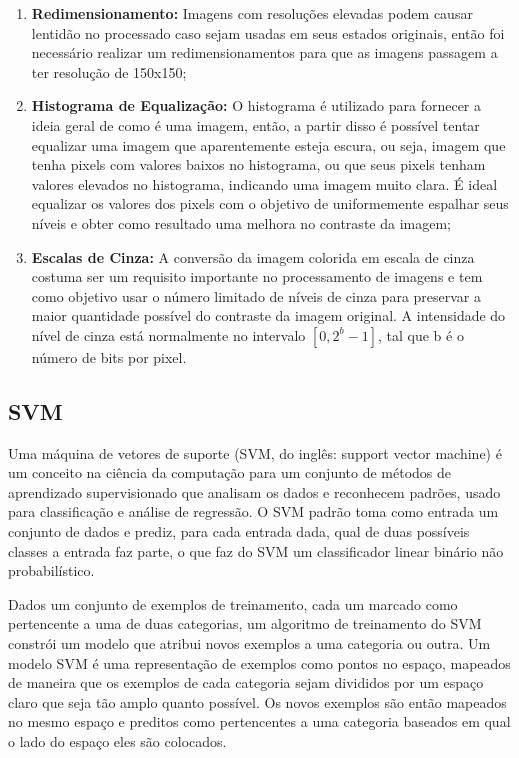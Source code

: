 \documentclass{article}
\begin{document}
\begin{enumerate}
    \item \label{sub:redm} \textbf{Redimensionamento:} Imagens com resoluções elevadas podem causar lentidão no processado caso sejam usadas em seus estados originais, então foi necessário realizar um redimensionamentos para que as imagens passagem a ter resolução de 150x150;
    \item \label{sub:histE} \textbf{Histograma de Equalização:} O histograma é utilizado para fornecer a ideia geral de como é uma imagem, então, a partir disso é possível tentar equalizar uma imagem que aparentemente esteja escura, ou seja, imagem que tenha pixels com valores baixos no histograma, ou que seus pixels tenham valores elevados no histograma, indicando uma imagem muito clara. É ideal equalizar os valores dos pixels com o objetivo de uniformemente espalhar seus níveis e obter como resultado uma melhora no contraste da imagem;
    \item \label{sub:gray} \textbf{Escalas de Cinza:} A conversão da imagem colorida em escala de cinza costuma ser um requisito importante no processamento de imagens e tem como objetivo usar o número limitado de níveis de cinza para preservar a maior quantidade possível do contraste da imagem original. A intensidade do nível de cinza está normalmente no intervalo \([0, 2^b - 1]\), tal que b é o número de bits por pixel.
\end{enumerate}

\subsection{SVM}
Uma máquina de vetores de suporte (SVM, do inglês: support vector machine) é um conceito na ciência da computação para um conjunto de métodos de aprendizado supervisionado que analisam os dados e reconhecem padrões, usado para classificação e análise de regressão. O SVM padrão toma como entrada um conjunto de dados e prediz, para cada entrada dada, qual de duas possíveis classes a entrada faz parte, o que faz do SVM um classificador linear binário não probabilístico. 

Dados um conjunto de exemplos de treinamento, cada um marcado como pertencente a uma de duas categorias, um algoritmo de treinamento do SVM constrói um modelo que atribui novos exemplos a uma categoria ou outra. Um modelo SVM é uma representação de exemplos como pontos no espaço, mapeados de maneira que os exemplos de cada categoria sejam divididos por um espaço claro que seja tão amplo quanto possível. Os novos exemplos são então mapeados no mesmo espaço e preditos como pertencentes a uma categoria baseados em qual o lado do espaço eles são colocados.
\end{document}
